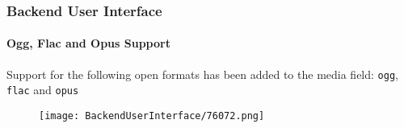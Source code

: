 \begin{frame}[fragile]
	\frametitle{Backend User Interface}
	\framesubtitle{Ogg, Flac and Opus Support}

	Support for the following open formats has been added to the media field:
	\texttt{ogg}, \texttt{flac} and \texttt{opus}

	\begin{figure}
		\texttt{[image: BackendUserInterface/76072.png]}
	\end{figure}

\end{frame}



